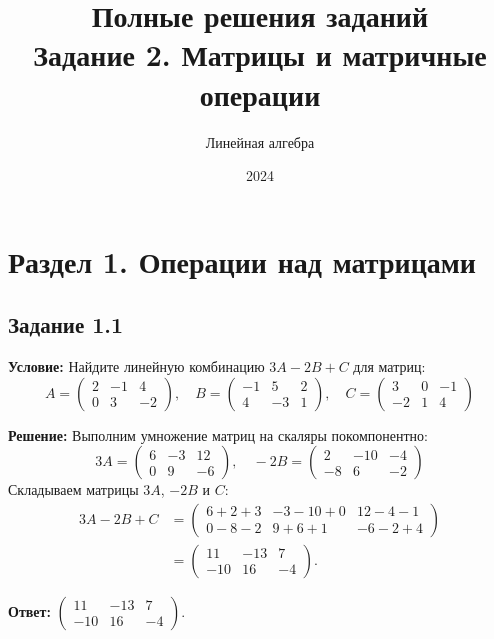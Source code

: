 \documentclass[11pt, a4paper]{article}
\title{\textbf{Полные решения заданий}\\ \large Задание 2. Матрицы и матричные операции}
\author{Линейная алгебра}
\date{2024}
\begin{document}
\maketitle

\section{Раздел 1. Операции над матрицами}

\subsection*{Задание 1.1}
\textbf{Условие:} Найдите линейную комбинацию $3A - 2B + C$ для матриц:
$$ A = \begin{pmatrix} 2 & -1 & 4 \\ 0 & 3 & -2 \end{pmatrix}, \quad B = \begin{pmatrix} -1 & 5 & 2 \\ 4 & -3 & 1 \end{pmatrix}, \quad C = \begin{pmatrix} 3 & 0 & -1 \\ -2 & 1 & 4 \end{pmatrix} $$

\textbf{Решение:}
Выполним умножение матриц на скаляры покомпонентно:
$$ 3A = \begin{pmatrix} 6 & -3 & 12 \\ 0 & 9 & -6 \end{pmatrix}, \quad -2B = \begin{pmatrix} 2 & -10 & -4 \\ -8 & 6 & -2 \end{pmatrix} $$
Складываем матрицы $3A$, $-2B$ и $C$:
\begin{align*}
3A - 2B + C &= \begin{pmatrix} 6 + 2 + 3 & -3 - 10 + 0 & 12 - 4 - 1 \\ 0 - 8 - 2 & 9 + 6 + 1 & -6 - 2 + 4 \end{pmatrix} \\
&= \begin{pmatrix} 11 & -13 & 7 \\ -10 & 16 & -4 \end{pmatrix}.
\end{align*}

\textbf{Ответ:} $\begin{pmatrix} 11 & -13 & 7 \\ -10 & 16 & -4 \end{pmatrix}$.
\end{document}

